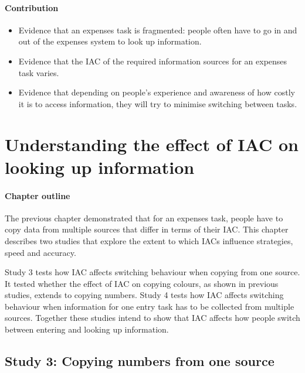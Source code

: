 \documentclass[11pt,oneside]{report}
\begin{document}
\subsubsection{Contribution}
\begin{itemize}
\item
Evidence that an expenses task is fragmented: people often have to go in and out of the expenses system to look up information.    
\item
Evidence that the IAC of the required information sources for an expenses task varies. 
\item
Evidence that depending on people's experience and awareness of how costly it is to access information, they will try to minimise switching between tasks.
\end{itemize}

\chapter{Understanding the effect of IAC on looking up information}

\begin{mynote}
\subsubsection{Chapter outline}
The previous chapter demonstrated that for an expenses task, people have to copy data from multiple sources that differ in terms of their IAC. This chapter describes two studies that explore the extent to which IACs influence strategies, speed and accuracy. 

Study 3 tests how IAC affects switching behaviour when copying from one source. It tested whether the effect of IAC on copying colours, as shown in previous studies, extends to copying numbers. Study 4 tests how IAC affects switching behaviour when information for one entry task has to be collected from multiple sources.
Together these studies intend to show that IAC affects how people switch between entering and looking up information.

\end{mynote}

 
\section{Study 3: Copying numbers from one source}\label{ch:Study2}
\end{document}

